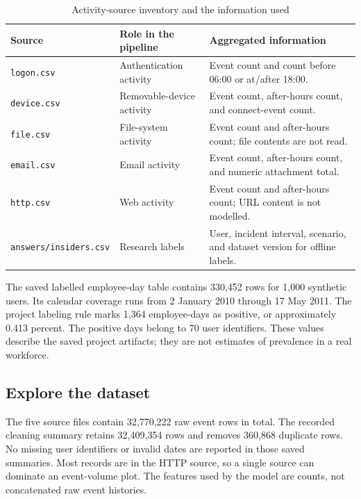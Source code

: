 \documentclass[12pt,a4paper,oneside]{report}
\newcommand{\tablefont}{\small}
\newcommand{\code}[1]{\texttt{\small #1}}
\begin{document}
\begin{table}[H]
\centering
\tablefont
\caption{Activity-source inventory and the information used}
\label{tab:source-inventory}
\begin{tabularx}{\textwidth}{|p{}|p{}|Y|}
\hline
\textbf{Source} & \textbf{Role in the pipeline} & \textbf{Aggregated information}\\\hline
\code{logon.csv} & Authentication activity & Event count and count before 06:00 or at/after 18:00.\\\hline
\code{device.csv} & Removable-device activity & Event count, after-hours count, and connect-event count.\\\hline
\code{file.csv} & File-system activity & Event count and after-hours count; file contents are not read.\\\hline
\code{email.csv} & Email activity & Event count, after-hours count, and numeric attachment total.\\\hline
\code{http.csv} & Web activity & Event count and after-hours count; URL content is not modelled.\\\hline
\code{answers/\allowbreak insiders.csv} & Research labels & User, incident interval, scenario, and dataset version for offline labels.\\\hline
\end{tabularx}
\end{table}

The saved labelled employee-day table contains 330,452 rows for 1,000
synthetic users. Its calendar coverage runs from 2 January 2010 through
17 May 2011. The project labeling rule marks 1,364 employee-days as
positive, or approximately 0.413 percent. The positive days belong to
70 user identifiers. These values describe the saved project
artifacts; they are not estimates of prevalence in a real workforce.

\subsection{Explore the dataset}
The five source files contain 32,770,222 raw event rows in total.
The recorded cleaning summary retains 32,409,354 rows and removes
360,868 duplicate rows. No missing user identifiers or invalid dates
are reported in those saved summaries. Most records are in the HTTP
source, so a single source can dominate an event-volume plot. The
features used by the model are counts, not concatenated raw event
histories.
\end{document}
